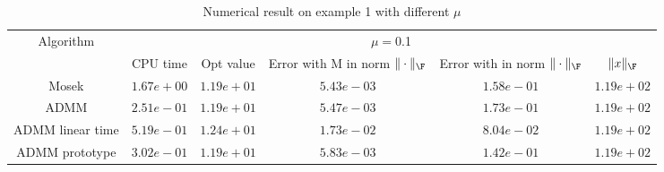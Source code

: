 \begin{table}
\centering
\begin{tabular}{|c|c|c|c|c|c|}

\hline
\multirow{2}{*}{ Algorithm} &\multicolumn{5}{c|}{$\mu=$0.1}\\\cline{2-6}
 &CPU time &Opt value &Error with M in norm $\|\cdot\|_\F$ &Error with in norm $\|\cdot\|_\F$ &$\|x\|_\F$\\\hline
Mosek & $1.67e+00$ & $1.19e+01$ & $5.43e-03$ & $1.58e-01$ & $1.19e+02$\\\hline
ADMM & $2.51e-01$ & $1.19e+01$ & $5.47e-03$ & $1.73e-01$ & $1.19e+02$\\\hline
ADMM linear time & $5.19e-01$ & $1.24e+01$ & $1.73e-02$ & $8.04e-02$ & $1.19e+02$\\\hline
ADMM prototype & $3.02e-01$ & $1.19e+01$ & $5.83e-03$ & $1.42e-01$ & $1.19e+02$\\\hline
\end{tabular}
\caption{Numerical result on example 1 with different $\mu$\label{example1}}
\end{table}
